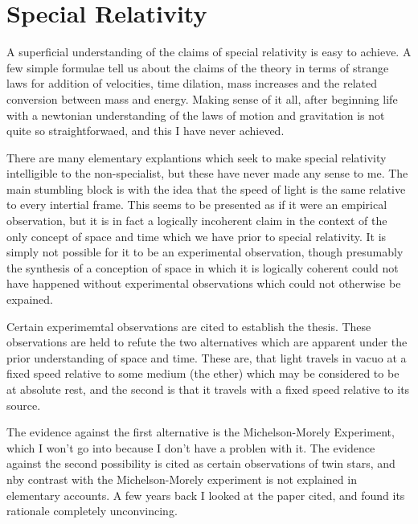 \documentclass[10pt,titlepage]{book}
\begin{document}
    \subsection{}

\section{Special Relativity}

A superficial understanding of the claims of special relativity is easy to achieve.
A few simple formulae tell us about the claims of the theory in terms of strange laws for addition of velocities, time dilation, mass increases and the related conversion between mass and energy.
Making sense of it all, after beginning life with a newtonian understanding of the laws of motion and gravitation is not quite so straightforwaed, and this I have never achieved.

There are many elementary explantions which seek to make special relativity intelligible to the non-specialist, but these have never made any sense to me.
The main stumbling block is with the idea that the speed of light is the same relative to every intertial frame.
This seems to be presented as if it were an empirical observation, but it is in fact a logically incoherent claim in the context of the only concept of space and time which we have prior to special relativity.
It is simply not possible for it to be an experimental observation, though presumably the synthesis of a conception of space in which it is logically coherent could not have happened without experimental observations which could not otherwise be expained.

Certain experimemtal observations are cited to establish the thesis.
These observations are held to refute the two alternatives which are apparent under the prior understanding of space and time.
These are, that light travels in vacuo at a fixed speed relative to some medium (the ether) which may be considered to be at absolute rest, and the second is that it travels with a fixed speed relative to its source.

The evidence against the first alternative is the Michelson-Morely Experiment, which I won't go into because I don't have a problen with it.
The evidence against the second possibility is cited as certain observations of twin stars, and nby contrast with the Michelson-Morely experiment is not explained in elementary accounts.
A few years back I looked at the paper cited, and found its rationale completely unconvincing.
\end{document}

